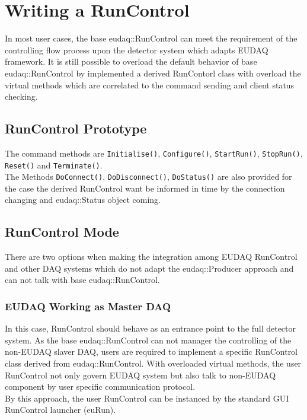 \section{Writing a RunControl}\label{sec:RunControlWriting}
In most user cases, the base eudaq::RunControl can meet the requirement of the controlling flow process upon the detector system which adapts EUDAQ framework. It is still possible to overload the default behavior of base eudaq::RunControl by implemented a derived RunContorl class with overload the virtual methods which are correlated to the command sending and client status checking.\\

\subsection{RunControl Prototype}
The command methods are \lstinline[style=cpp]{Initialise()}, \lstinline[style=cpp]{Configure()}, \lstinline[style=cpp]{StartRun()}, \lstinline[style=cpp]{StopRun()}, \lstinline[style=cpp]{Reset()} and \lstinline[style=cpp]{Terminate()}. \\

The Methods \lstinline[style=cpp]{DoConnect()}, \lstinline[style=cpp]{DoDisconnect()}, \lstinline[style=cpp]{DoStatus()} are also provided for the case the derived RunControl want be informed in time by the connection changing and eudaq::Status object coming.\\


\subsection{RunControl Mode}
There are two options when making the integration among EUDAQ RunControl and other DAQ systems which do not adapt the eudaq::Producer approach and can not talk with base eudaq::RunControl.
\subsubsection{EUDAQ Working as Master DAQ}
In this case, RunControl should behave as an entrance point to the full detector system. As the base eudaq::RunControl can not manager the controlling of the non-EUDAQ slaver DAQ, users are required to implement a specific RunControl class derived from eudaq::RunControl. With overloaded virtual methods, the user RunControl not only govern EUDAQ system but also talk to non-EUDAQ component by user specific communication protocol.\\
By this approach, the user RunControl can be instanced by the standard GUI RunControl launcher (euRun).

